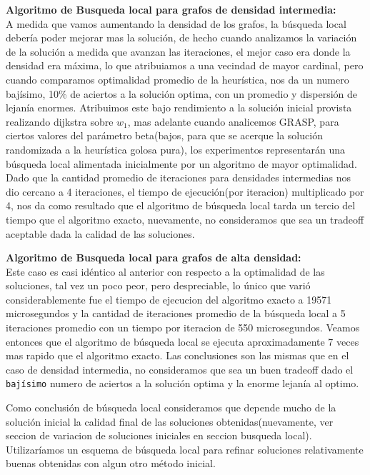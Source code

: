 \vspace{0.5cm}

\textbf{Algoritmo de Busqueda local para grafos de densidad intermedia:}\\
A medida que vamos aumentando la densidad de los grafos, la b\'usqueda local deber\'ia poder mejorar mas la soluci\'on, de hecho cuando analizamos la variaci\'on de la soluci\'on a medida que avanzan las iteraciones, el mejor caso era donde la densidad era m\'axima, lo que atribuiamos a una vecindad de mayor cardinal, pero cuando comparamos optimalidad promedio de la heur\'istica, nos da un numero baj\'isimo, 10\% de aciertos a la soluci\'on optima, con un promedio y dispersi\'on de lejan\'ia enormes. Atribuimos este bajo rendimiento a la soluci\'on inicial provista realizando dijkstra sobre $w_1$, mas adelante cuando analicemos GRASP, para ciertos valores del par\'ametro beta(bajos, para que se acerque la soluci\'on randomizada a la heur\'istica golosa pura), los experimentos representar\'an una b\'usqueda local alimentada inicialmente por un algoritmo de mayor optimalidad. Dado que la cantidad promedio de iteraciones para densidades intermedias nos dio cercano a 4 iteraciones, el tiempo de ejecuci\'on(por iteracion) multiplicado por 4, nos da como resultado que el algoritmo de b\'usqueda local tarda un tercio del tiempo que el algoritmo exacto, nuevamente, no consideramos que sea un tradeoff aceptable dada la calidad de las soluciones.

\vspace{0.5cm}

\textbf{Algoritmo de Busqueda local para grafos de alta densidad:}\\
Este caso es casi id\'entico al anterior con respecto a la optimalidad de las soluciones, tal vez un poco peor, pero despreciable, lo \'unico que vari\'o considerablemente fue el tiempo de ejecucion del algoritmo exacto a 19571 microsegundos y la cantidad de iteraciones promedio de la b\'usqueda local a 5 iteraciones promedio con un tiempo por iteracion de 550 microsegundos. Veamos entonces que el algoritmo de b\'usqueda local se ejecuta aproximadamente 7 veces mas rapido que el algoritmo exacto. Las conclusiones son las mismas que en el caso de densidad intermedia, no consideramos que sea un buen tradeoff dado el \texttt{baj\'isimo} numero de aciertos a la soluci\'on optima y la enorme lejan\'ia al optimo.

\vspace{0.5cm}

Como conclusi\'on de b\'usqueda local consideramos que depende mucho de la soluci\'on inicial la calidad final de las soluciones obtenidas(nuevamente, ver seccion de variacion de soluciones iniciales en seccion busqueda local). Utilizar\'iamos un esquema de b\'usqueda local para refinar soluciones relativamente buenas obtenidas con algun otro m\'etodo inicial.

